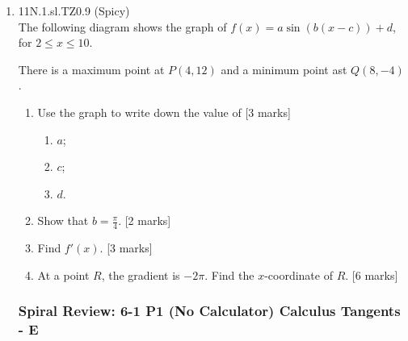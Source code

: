 \documentclass[12pt, twoside]{article}
\begin{document}
\begin{enumerate}
  \item 11N.1.sl.TZ0.9 (Spicy)\\
  The following diagram shows the graph of $f(x)=a \sin (b(x-c))+d$, for $2 \leq x \leq 10$.
    \begin{center}
    \end{center}
    There is a maximum point at $P(4,12)$ and a minimum point ast $Q(8, -4)$.
    \begin{enumerate}
      \item Use the graph to write down the value of [3 marks]
        \begin{enumerate}
          \item $a$;
          \item $c$;
          \item $d$.
        \end{enumerate}
      \item Show that $b= \frac{\pi}{4}$. [2 marks]
      \item Find $f'(x)$. [3 marks]
      \item At a point $R$, the gradient is $-2 \pi$. Find the $x$-coordinate of $R$. [6 marks]
    \end{enumerate}

\newpage
\setcounter{enumi}{0}
\subsubsection*{Spiral Review: 6-1 P1 (No Calculator) Calculus Tangents - E}


\end{enumerate}
\end{document}
